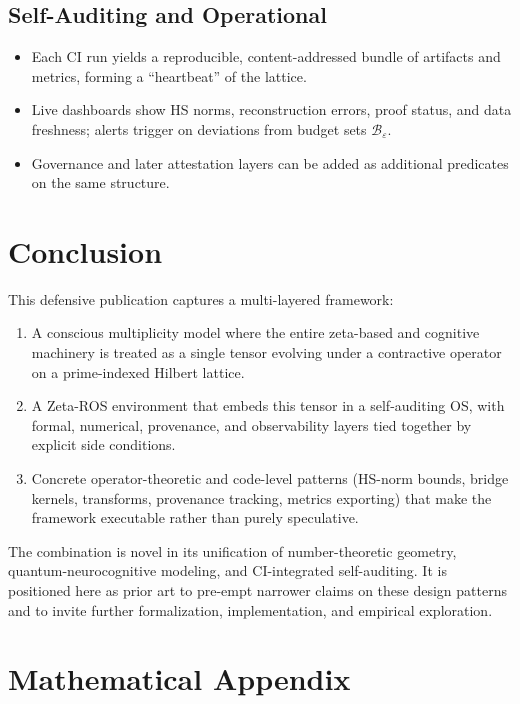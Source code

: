 \documentclass[11pt]{article}
\begin{document}
\subsection{Self-Auditing and Operational}

\begin{itemize}[leftmargin=*]
  \item Each CI run yields a reproducible, content-addressed bundle of artifacts and metrics, forming a ``heartbeat'' of the lattice.
  \item Live dashboards show HS norms, reconstruction errors, proof status, and data freshness; alerts trigger on deviations from budget sets $\mathcal{B}_\varepsilon$.
  \item Governance and later attestation layers can be added as additional predicates on the same structure.
\end{itemize}

\section{Conclusion}

This defensive publication captures a multi-layered framework:

\begin{enumerate}[leftmargin=*]
  \item A conscious multiplicity model where the entire zeta-based and cognitive machinery is treated as a single tensor evolving under a contractive operator on a prime-indexed Hilbert lattice.
  \item A Zeta-ROS environment that embeds this tensor in a self-auditing OS, with formal, numerical, provenance, and observability layers tied together by explicit side conditions.
  \item Concrete operator-theoretic and code-level patterns (HS-norm bounds, bridge kernels, transforms, provenance tracking, metrics exporting) that make the framework executable rather than purely speculative.
\end{enumerate}

The combination is novel in its unification of number-theoretic geometry, quantum-neurocognitive modeling, and CI-integrated self-auditing. It is positioned here as prior art to pre-empt narrower claims on these design patterns and to invite further formalization, implementation, and empirical exploration.

\appendix
\section*{Mathematical Appendix}
\end{document}
